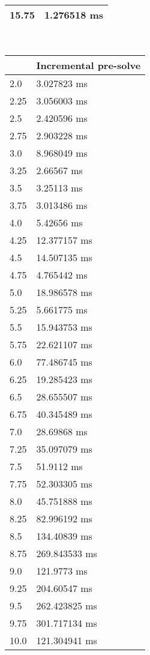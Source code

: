 \begin{multicols}{2}
\begin{tabular}{|l|l|}
		15.75 & 1.276518 ms \\ \hline
	\end{tabular}\\
	\begin{tabular}{|l|l|}
		\hline
		& Incremental pre-solve \\ \hline
		2.0 & 3.027823 ms \\ \hline
		2.25 & 3.056003 ms \\ \hline
		2.5 & 2.420596 ms \\ \hline
		2.75 & 2.903228 ms \\ \hline
		3.0 & 8.968049 ms \\ \hline
		3.25 & 2.66567 ms \\ \hline
		3.5 & 3.25113 ms \\ \hline
		3.75 & 3.013486 ms \\ \hline
		4.0 & 5.42656 ms \\ \hline
		4.25 & 12.377157 ms \\ \hline
		4.5 & 14.507135 ms \\ \hline
		4.75 & 4.765442 ms \\ \hline
		5.0 & 18.986578 ms \\ \hline
		5.25 & 5.661775 ms \\ \hline
		5.5 & 15.943753 ms \\ \hline
		5.75 & 22.621107 ms \\ \hline
		6.0 & 77.486745 ms \\ \hline
		6.25 & 19.285423 ms \\ \hline
		6.5 & 28.655507 ms \\ \hline
		6.75 & 40.345489 ms \\ \hline
		7.0 & 28.69868 ms \\ \hline
		7.25 & 35.097079 ms \\ \hline
		7.5 & 51.9112 ms \\ \hline
		7.75 & 52.303305 ms \\ \hline
		8.0 & 45.751888 ms \\ \hline
		8.25 & 82.996192 ms \\ \hline
		8.5 & 134.40839 ms \\ \hline
		8.75 & 269.843533 ms \\ \hline
		9.0 & 121.9773 ms \\ \hline
		9.25 & 204.60547 ms \\ \hline
		9.5 & 262.423825 ms \\ \hline
		9.75 & 301.717134 ms \\ \hline
		10.0 & 121.304941 ms \\ \hline

\end{tabular}
\end{multicols}
